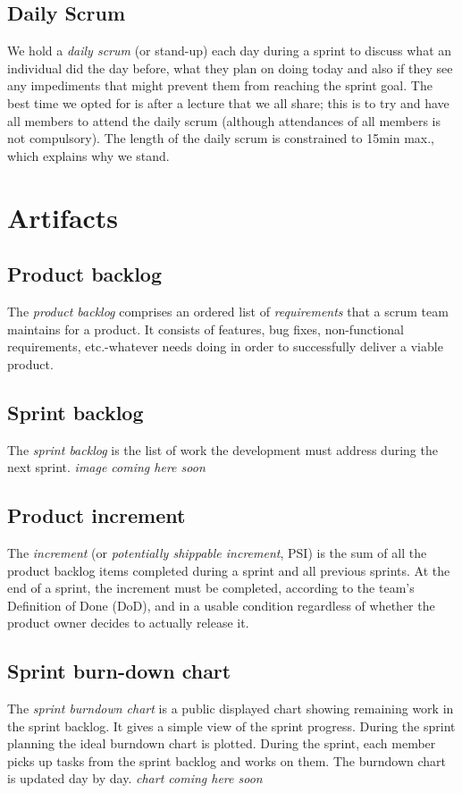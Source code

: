 \documentclass[hidelinks, 12pt, oneside]{article}
\begin{document}
	\subsection{Daily Scrum}
 	We hold a \emph{daily scrum} (or stand-up) each day during a sprint to discuss what an individual did the day before, what they plan on doing today and also if they 
 	see any impediments that might prevent them from reaching the sprint goal. The best time we opted for is after a lecture that we all share; this is to try and have 
 	all members	to attend the daily scrum (although attendances of all members is not compulsory). The length of the daily scrum is constrained to 15min max., which explains 
 	why we stand.\newpage 
 	
 	\section{Artifacts}
 	\subsection{Product backlog}
 	The \emph{product backlog} comprises an ordered list of \emph{requirements} that a scrum team maintains for a product. It consists of features, bug fixes, non-functional 
 	requirements, etc.-whatever needs doing in order to successfully deliver a viable product.
 	\subsection{Sprint backlog}
 	The \emph{sprint backlog} is the list of work the development must address during the next sprint.\newline\newline
 	\emph{image coming here soon}
 	\subsection{Product increment}
 	The \emph{increment} (or \emph{potentially shippable increment}, PSI) is the sum of all the product backlog items completed during a sprint and all previous sprints. At the end 
 	of a sprint, the increment must be completed, according to the team's Definition of Done (DoD), and in a usable condition regardless of whether the product owner decides to actually
 	release it.
 	\subsection{Sprint burn-down chart}
	The \emph{sprint burndown chart} is a public displayed chart showing remaining work in the sprint backlog. It gives a simple view of the sprint progress. During the sprint planning 
	the ideal burndown chart is plotted. During the sprint, each member picks up tasks from the sprint backlog and works on them. The burndown chart is updated day by day.\newline\newline
	\emph{chart coming here soon}
 	
\end{document}
